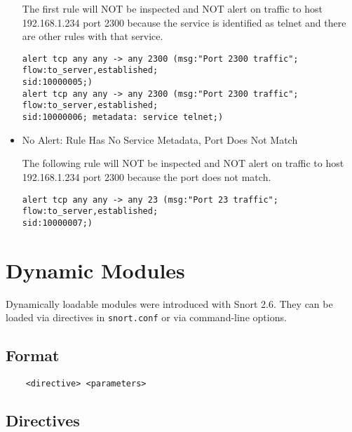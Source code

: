 \documentclass[english]{report}
\begin{document}
\begin{itemize}
The first rule will NOT be inspected and NOT alert on traffic to host 192.168.1.234
port 2300 because the service is identified as telnet and there are other rules with
that service.

\begin{verbatim}
alert tcp any any -> any 2300 (msg:"Port 2300 traffic"; flow:to_server,established;
sid:10000005;)
alert tcp any any -> any 2300 (msg:"Port 2300 traffic"; flow:to_server,established;
sid:10000006; metadata: service telnet;)
\end{verbatim}

\item{No Alert: Rule Has No Service Metadata, Port Does Not Match}

The following rule will NOT be inspected and NOT alert on traffic to host 192.168.1.234
port 2300 because the port does not match.

\begin{verbatim}
alert tcp any any -> any 23 (msg:"Port 23 traffic"; flow:to_server,established;
sid:10000007;)
\end{verbatim}

\end{itemize}

\section{Dynamic Modules}

Dynamically loadable modules were introduced with Snort 2.6.  They can be
loaded via directives in \texttt{snort.conf} or via command-line options.

\subsection{Format}

\begin{verbatim}
    <directive> <parameters>
\end{verbatim}

\subsection{Directives}
\end{document}
